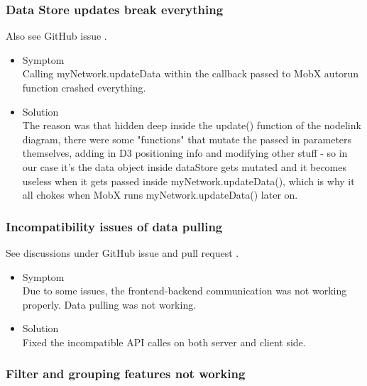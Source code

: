 \documentclass[oneside, english, final]{design}
\begin{document}
\subsubsection{Data Store updates break everything}

Also see GitHub issue \href{https://github.com/DHSTTOS/implementation/issues/69}{\color{blue}{\#69}}.

\begin{itemize}
      \item{Symptom
            \\
            Calling myNetwork.updateData within the callback passed to MobX autorun function crashed everything.}

      \item{Solution
            \\
            The reason was that hidden deep inside the update() function of the nodelink diagram, there were some "functions" that mutate the passed in parameters themselves, adding in D3 positioning info and modifying other stuff - so in our case it's the data object inside dataStore gets mutated and it becomes useless when it gets passed inside myNetwork.updateData(), which is why it all chokes when MobX runs myNetwork.updateData() later on.
            }
\end{itemize}

\subsubsection{Incompatibility issues of data pulling}

See discussions under GitHub issue \href{https://github.com/DHSTTOS/implementation/issues/69}{\color{blue}{\#69}} and pull request \href{https://github.com/DHSTTOS/implementation/issues/78}{\color{blue}{\#78}}.

\begin{itemize}
      \item{Symptom
            \\
            Due to some issues, the frontend-backend communication was not working properly. Data pulling was not working.}

      \item{Solution
            \\
            Fixed the incompatible API calles on both server and client side.
            }
\end{itemize}

\subsubsection{Filter and grouping features not working}
\end{document}

